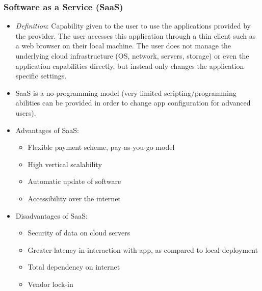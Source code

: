 \documentclass{article}
\begin{document}
\subsubsection{Software as a Service (SaaS)}
\begin{itemize}
    \item \textit{Definition}: Capability given to the user to use the applications provided by the provider. The user accesses this application through a thin client such as a web browser on their local machine. The user does not manage the underlying cloud infrastructure (OS, network, servers, storage) or even the application capabilities directly, but instead only changes the application specific settings. 
    
    \item SaaS is a no-programming model (very limited scripting/programming abilities can be provided in order to change app configuration for advanced users). 
    
    \item Advantages of SaaS:
    \begin{itemize}
        \item Flexible payment scheme, pay-as-you-go model
        
        \item High vertical scalability
        
        \item Automatic update of software
        
        \item Accessibility over the internet
    \end{itemize}
    
    \item Disadvantages of SaaS:
    \begin{itemize}
        \item Security of data on cloud servers
        
        \item Greater latency in interaction with app, as compared to local deployment
        
        \item Total dependency on internet
        
        \item Vendor lock-in
    \end{itemize}
\end{itemize}
\end{document}
